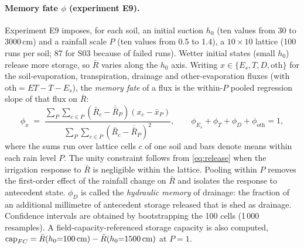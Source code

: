 \documentclass[preprint,12pt,authoryear]{elsarticle}
\begin{document}
\paragraph{Memory fate $\phi$ (experiment E9).}
Experiment E9 imposes, for each soil, an initial suction $h_0$ (ten values from 30 to 3000\,cm) and a rainfall scale $P$ (ten values from 0.5 to 1.4), a $10\times10$ lattice (100 runs per soil; 87 for S03 because of failed runs). Wetter initial states (small $h_0$) release more storage, so $\bar R$ varies along the $h_0$ axis. Writing $x\in\{E_s,T,D,\text{oth}\}$ for the soil-evaporation, transpiration, drainage and other-evaporation fluxes (with $\text{oth}=\mathit{ET}-T-E_s$), the \emph{memory fate} of a flux is the within-$P$ pooled regression slope of that flux on $\bar R$:
\begin{equation}
\phi_x \;=\; \frac{\sum_{P}\sum_{c\in P}(\bar R_c-\overline{\bar R}_P)(x_c-\bar x_P)}{\sum_{P}\sum_{c\in P}(\bar R_c-\overline{\bar R}_P)^2},\qquad \phi_{E_s}+\phi_T+\phi_D+\phi_{\mathrm{oth}}=1 ,
\label{eq:phi}
\end{equation}
where the sums run over lattice cells $c$ of one soil and bars denote means within each rain level $P$. The unity constraint follows from \cref{eq:release} when the irrigation response to $\bar R$ is negligible within the lattice. Pooling within $P$ removes the first-order effect of the rainfall change on $\bar R$ and isolates the response to antecedent state. $\phi_D$ is called the \emph{hydraulic memory} of drainage: the fraction of an additional millimetre of antecedent storage released that is shed as drainage. Confidence intervals are obtained by bootstrapping the 100 cells (1\,000 resamples). A field-capacity-referenced storage capacity is also computed, $\mathrm{cap}_{FC}=\bar R(h_0{=}100\text{\,cm})-\bar R(h_0{=}1500\text{\,cm})$ at $P=1$.
\end{document}
